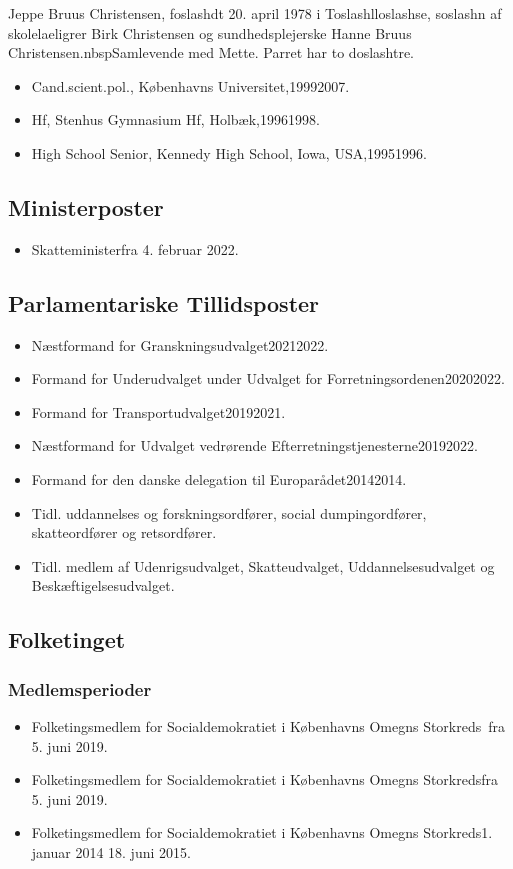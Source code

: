 \documentclass[11pt, a4paper]{awesome-cv}
\begin{document}
\makecvheader[R]
\makelettertitle
\begin{cvletter}
Jeppe Bruus Christensen, foslashdt 20. april 1978 i Toslashlloslashse, soslashn af skolelaeligrer Birk Christensen og sundhedsplejerske Hanne Bruus Christensen.nbspSamlevende med Mette. Parret har to doslashtre.

\begin{itemize}
\item Cand.scient.pol., Københavns Universitet,19992007.
\item Hf, Stenhus Gymnasium  Hf, Holbæk,19961998.
\item High School Senior, Kennedy High School, Iowa, USA,19951996.
\end{itemize}
\subsection*{Ministerposter}
\begin{itemize}
\item Skatteministerfra 4. februar 2022.
\end{itemize}
\subsection*{Parlamentariske Tillidsposter}
\begin{itemize}
\item Næstformand for Granskningsudvalget20212022.
\item Formand for Underudvalget under Udvalget for Forretningsordenen20202022.
\item Formand for Transportudvalget20192021.
\item Næstformand for Udvalget vedrørende Efterretningstjenesterne20192022.
\item Formand for den danske delegation til Europarådet20142014.
\item Tidl. uddannelses og forskningsordfører, social dumpingordfører, skatteordfører og retsordfører.
\item Tidl. medlem af Udenrigsudvalget, Skatteudvalget, Uddannelsesudvalget og Beskæftigelsesudvalget.
\end{itemize}
\subsection*{Folketinget}
\subsubsection*{Medlemsperioder}
\begin{itemize}
\item Folketingsmedlem for Socialdemokratiet i Københavns Omegns Storkreds fra 5. juni 2019.
\item Folketingsmedlem for Socialdemokratiet i Københavns Omegns Storkredsfra 5. juni 2019.
\item Folketingsmedlem for Socialdemokratiet i Københavns Omegns Storkreds1. januar 2014  18. juni 2015.
\end{itemize}

\end{cvletter}
\end{document}
